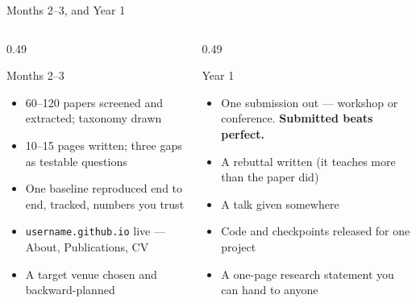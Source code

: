 \documentclass[aspectratio=169,11pt]{beamer}
\newcommand{\code}[1]{\texttt{\small #1}}
\newcommand{\key}[1]{\textbf{\color{brand}#1}}
\begin{document}
\begin{frame}{Months 2--3, and Year 1}
\begin{columns}[T]
\begin{column}{0.49\textwidth}
\begin{block}{Months 2--3}
\footnotesize
\begin{itemize}
  \item 60--120 papers screened and extracted; taxonomy drawn
  \item 10--15 pages written; three gaps as testable questions
  \item One baseline reproduced end to end, tracked, numbers you trust
  \item \code{username.github.io} live --- About, Publications, CV
  \item A target venue chosen and backward-planned
\end{itemize}
\end{block}
\end{column}
\begin{column}{0.49\textwidth}
\begin{block}{Year 1}
\footnotesize
\begin{itemize}
  \item One submission out --- workshop or conference. \key{Submitted beats
        perfect.}
  \item A rebuttal written (it teaches more than the paper did)
  \item A talk given somewhere
  \item Code and checkpoints released for one project
  \item A one-page research statement you can hand to anyone
\end{itemize}
\end{block}
\end{column}
\end{columns}
\end{frame}
\end{document}
